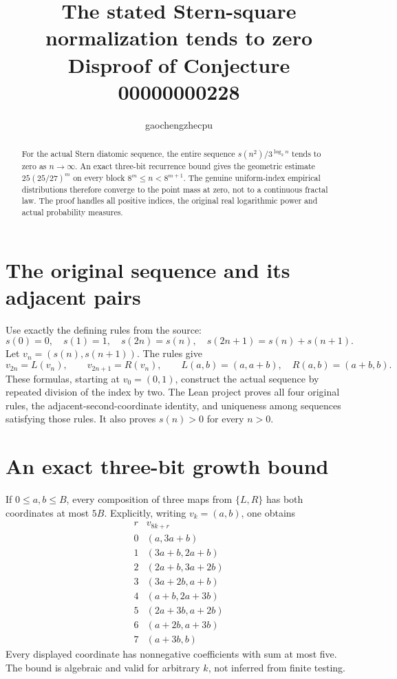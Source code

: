 \documentclass[11pt]{article}
\title{The stated Stern-square normalization tends to zero\newline
\large Disproof of Conjecture 00000000228}
\author{gaochengzhecpu}\date{}
\begin{document}
\maketitle
\begin{abstract}
For the actual Stern diatomic sequence, the entire
sequence $s(n^2)/3^{\log_2 n}$ tends to zero as
$n\to\infty$. An exact three-bit recurrence bound
gives the geometric estimate $25(25/27)^m$ on every
block $8^m\leq n<8^{m+1}$. The genuine uniform-index
empirical distributions therefore converge to the
point mass at zero, not to a continuous fractal law.
The proof handles all positive indices, the original
real logarithmic power and actual probability measures.
\end{abstract}

\section*{The original sequence and its adjacent pairs}
Use exactly the defining rules from the source:
\[
 s(0)=0,\quad s(1)=1,\quad s(2n)=s(n),\quad
                  s(2n+1)=s(n)+s(n+1).
\]
Let $v_n=(s(n),s(n+1))$. The rules give
\[
 v_{2n}=L(v_n),\qquad v_{2n+1}=R(v_n),\qquad
 L(a,b)=(a,a+b),\quad R(a,b)=(a+b,b).
\]
These formulas, starting at $v_0=(0,1)$, construct
the actual sequence by repeated division of the
index by two. The Lean project proves all four
original rules, the adjacent-second-coordinate
identity, and uniqueness among sequences satisfying
those rules. It also proves $s(n)>0$ for every $n>0$.

\section*{An exact three-bit growth bound}
If $0\leq a,b\leq B$, every composition of three
maps from $\{L,R\}$ has both coordinates at most
$5B$. Explicitly, writing $v_k=(a,b)$, one obtains
\[
\begin{array}{c|c}
 r&v_{8k+r}\\\hline
 0&(a,3a+b)\\
 1&(3a+b,2a+b)\\
 2&(2a+b,3a+2b)\\
 3&(3a+2b,a+b)\\
 4&(a+b,2a+3b)\\
 5&(2a+3b,a+2b)\\
 6&(a+2b,a+3b)\\
 7&(a+3b,b)
\end{array}
\]
Every displayed coordinate has nonnegative coefficients
with sum at most five. The bound is algebraic and
valid for arbitrary $k$, not inferred from finite testing.
\end{document}
